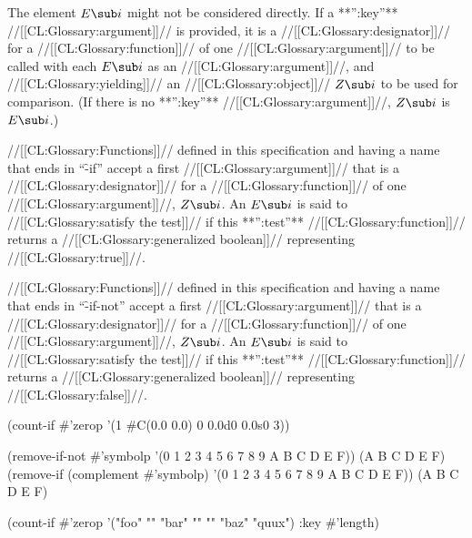 The element $E\sub i$ might not be considered directly. If a **'':key''** //[[CL:Glossary:argument]]// is provided, it is a //[[CL:Glossary:designator]]// for a //[[CL:Glossary:function]]// of one //[[CL:Glossary:argument]]//  to be called with each $E\sub i$ as an //[[CL:Glossary:argument]]//,  and //[[CL:Glossary:yielding]]// an //[[CL:Glossary:object]]// $Z\sub i$ to be used for comparison. (If there is no **'':key''** //[[CL:Glossary:argument]]//, $Z\sub i$ is $E\sub i$.)

//[[CL:Glossary:Functions]]// defined in this specification and having a name that ends in ``\f{-if}'' accept a first //[[CL:Glossary:argument]]// that is a //[[CL:Glossary:designator]]// for a  //[[CL:Glossary:function]]// of one //[[CL:Glossary:argument]]//, $Z\sub i$. An $E\sub i$ is said to //[[CL:Glossary:satisfy the test]]// if this **'':test''** //[[CL:Glossary:function]]// returns a //[[CL:Glossary:generalized boolean]]// representing //[[CL:Glossary:true]]//.

//[[CL:Glossary:Functions]]// defined in this specification and having a name that ends in ``\f{-if-not}'' accept a first //[[CL:Glossary:argument]]// that is a //[[CL:Glossary:designator]]// for a  //[[CL:Glossary:function]]// of one //[[CL:Glossary:argument]]//, $Z\sub i$. An $E\sub i$ is said to //[[CL:Glossary:satisfy the test]]// if this **'':test''** //[[CL:Glossary:function]]// returns a //[[CL:Glossary:generalized boolean]]// representing //[[CL:Glossary:false]]//.


\code
 (count-if #'zerop '(1 #C(0.0 0.0) 0 0.0d0 0.0s0 3)) 

 (remove-if-not #'symbolp '(0 1 2 3 4 5 6 7 8 9 A B C D E F)) \EV (A B C D E F)
 (remove-if (complement #'symbolp) '(0 1 2 3 4 5 6 7 8 9 A B C D E F)) \EV (A B C D E F)

 (count-if #'zerop '("foo" "" "bar" "" "" "baz" "quux") :key #'length)  \endcode

\endsubsubsection%

\endsubsection%
